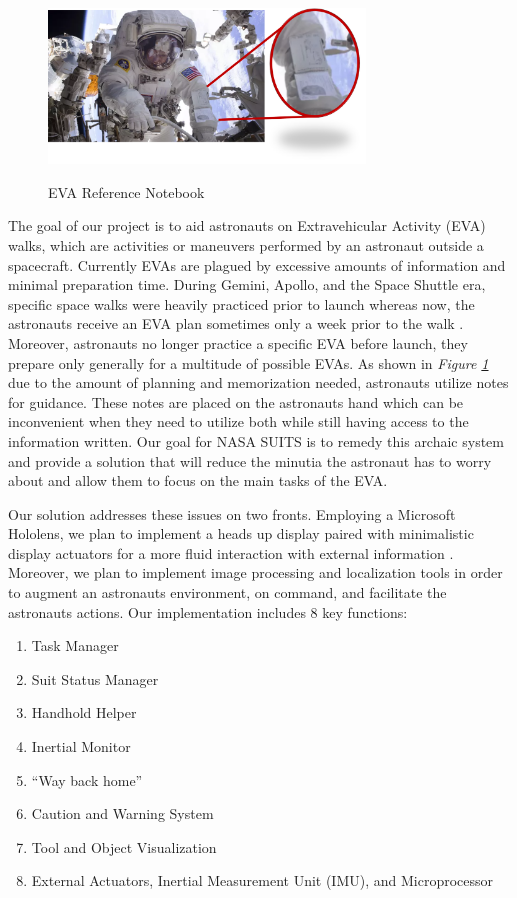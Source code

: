 \documentclass{article}
\begin{document}
\begin{figure}[!htb]
  \centering
  \caption{EVA Reference Notebook}
  \includegraphics[width=0.75\textwidth]{assets/spacesuitdisplay.png}
  \label{fig:spacesuitdisplay}
\end{figure}

The goal of our project is to aid astronauts on Extravehicular Activity (EVA) walks, which are activities or maneuvers performed by an astronaut outside a spacecraft. Currently EVAs are plagued by excessive amounts of information and minimal preparation time. During Gemini, Apollo, and the Space Shuttle era, specific space walks were heavily practiced prior to launch whereas now, the astronauts receive an EVA plan sometimes only a week prior to the walk \autocite{mannedspaceflight}. Moreover, astronauts no longer practice a specific EVA before launch, they prepare only generally for a multitude of possible EVAs. As shown in \textit{Figure \ref{fig:spacesuitdisplay}} due to the amount of planning and memorization needed, astronauts utilize notes for guidance. These notes are placed on the astronauts hand which can be inconvenient when they need to utilize both while still having access to the information written. Our goal for NASA SUITS is to remedy this archaic system and provide a solution that will reduce the minutia the astronaut has to worry about and allow them to focus on the main tasks of the EVA.

Our solution addresses these issues on two fronts. Employing a Microsoft Hololens, we plan to implement a heads up display paired with minimalistic display actuators for a more fluid interaction with external information \autocite{mrbasics}. Moreover, we plan to implement image processing and localization tools in order to augment an astronauts environment, on command, and facilitate the astronauts actions. Our implementation includes 8 key functions:

\begin{enumerate}
\item Task Manager
\item Suit Status Manager
\item Handhold Helper
\item Inertial Monitor
\item “Way back home”
\item Caution and Warning System
\item Tool and Object Visualization
\item External Actuators, Inertial Measurement Unit (IMU), and Microprocessor
\end{enumerate}
\end{document}
